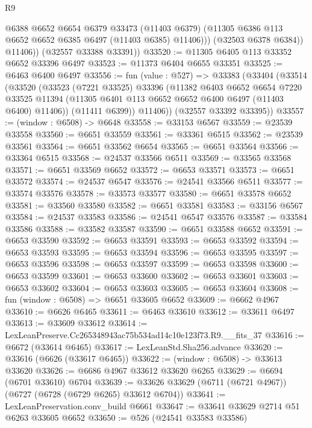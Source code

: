 \begin{lexlean}{R9}
\begin{coremodule}
                @6388
                @6652
                @6654
                @6379
                @33473
                (@11403 @6379)
                (@11305 @6386 @113 @6652 @6652 @6385 @6497 (@11403 @6385) @11406)))
            (@32503 @6378 @6384))
          @11406))
      (@32557 @33388 @33391))
@33520 := @11305 @6405 @113 @33352 @6652 @33396 @6497
@33523 := @11373 @6404 @6655 @33351
@33525 := @6463 @6400 @6497
@33556 := fun (value : @527) =>
  @33383
    (@33404
      (@33514
        (@33520
          (@33523
            (@7221 @33525)
            @33396
            (@11382
              @6403
              @6652
              @6654
              @7220
              @33525
              @11394
              (@11305 @6401 @113 @6652 @6652 @6400 @6497 (@11403 @6400) @11406))
            (@11411 @6399))
          @11406))
      (@32557 @33392 @33395))
@33557 := (window : @6508) -> @6648
@33558 := @33153 @6567
@33559 := @23539 @33558
@33560 := @6651 @33559
@33561 := @33361 @6515
@33562 := @23539 @33561
@33564 := @6651 @33562 @6654
@33565 := @6651 @33564
@33566 := @33364 @6515
@33568 := @24537 @33566 @6511
@33569 := @33565 @33568
@33571 := @6651 @33569 @6652
@33572 := @6653 @33571
@33573 := @6651 @33572
@33574 := @24537 @6547
@33576 := @24541 @33566 @6511
@33577 := @33574 @33576
@33578 := @33573 @33577
@33580 := @6651 @33578 @6652
@33581 := @33560 @33580
@33582 := @6651 @33581
@33583 := @33156 @6567
@33584 := @24537 @33583
@33586 := @24541 @6547 @33576
@33587 := @33584 @33586
@33588 := @33582 @33587
@33590 := @6651 @33588 @6652
@33591 := @6653 @33590
@33592 := @6653 @33591
@33593 := @6653 @33592
@33594 := @6653 @33593
@33595 := @6653 @33594
@33596 := @6653 @33595
@33597 := @6653 @33596
@33598 := @6653 @33597
@33599 := @6653 @33598
@33600 := @6653 @33599
@33601 := @6653 @33600
@33602 := @6653 @33601
@33603 := @6653 @33602
@33604 := @6653 @33603
@33605 := @6653 @33604
@33608 := fun (window : @6508) => @6651 @33605 @6652
@33609 := @6662 @4967
@33610 := @6626 @6465
@33611 := @6463 @33610
@33612 := @33611 @6497
@33613 := @33609 @33612
@33614 := LexLeanPreserve.Cc265348943ac75b534ad14c10e123f73.R9.__fits_37
@33616 := @6672 (@33614 @6465)
@33617 := LexLeanStd.Sha256.advance
@33620 := @33616 (@6626 (@33617 @6465))
@33622 := (window : @6508) -> @33613 @33620
@33626 := @6686 @4967 @33612 @33620 @6265
@33629 := @6694 (@6701 @33610) @6704
@33639 := @33626 @33629 (@6711 (@6721 @4967)) (@6727 (@6728 (@6729 @6265) @33612 @6704))
@33641 := LexLeanPreservation.conv_build @6661
@33647 := @33641 @33629 @2714 @51 @6263 @33605 @6652
@33650 := @526 (@24541 @33583 @33586)

\end{coremodule}
\end{lexlean}
